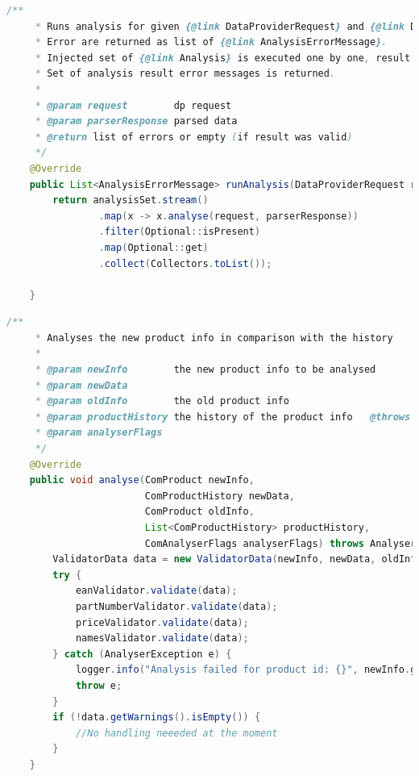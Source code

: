 \documentclass[thesis=B,czech]{FITthesis}[2012/06/26]
\begin{document}
\begin{lstlisting}[language=Java, caption={Upravená implementace hlavní metody ve třídě zajišťující spouštění validací analyzátoru}]
    /**
     * Runs analysis for given {@link DataProviderRequest} and {@link DPParserResponse}.
     * Error are returned as list of {@link AnalysisErrorMessage}.
     * Injected set of {@link Analysis} is executed one by one, result unwrapped and kept if present.
     * Set of analysis result error messages is returned.
     *
     * @param request        dp request
     * @param parserResponse parsed data
     * @return list of errors or empty (if result was valid)
     */
    @Override
    public List<AnalysisErrorMessage> runAnalysis(DataProviderRequest request, DPParserResponse parserResponse) {
        return analysisSet.stream()
                .map(x -> x.analyse(request, parserResponse))
                .filter(Optional::isPresent)
                .map(Optional::get)
                .collect(Collectors.toList());

    }
\end{lstlisting}
\par
\begin{lstlisting}[language=Java, caption={Původní implementace hlavní metody ve třídě zajišťující spouštění validací analyzátoru}]
    /**
     * Analyses the new product info in comparison with the history
     *
     * @param newInfo        the new product info to be analysed
     * @param newData
     * @param oldInfo        the old product info
     * @param productHistory the history of the product info   @throws AnalyserException when analysing fails, contains error type
     * @param analyserFlags
     */
    @Override
    public void analyse(ComProduct newInfo,
                        ComProductHistory newData,
                        ComProduct oldInfo,
                        List<ComProductHistory> productHistory,
                        ComAnalyserFlags analyserFlags) throws AnalyserException {
        ValidatorData data = new ValidatorData(newInfo, newData, oldInfo, productHistory, analyserFlags);
        try {
            eanValidator.validate(data);
            partNumberValidator.validate(data);
            priceValidator.validate(data);
            namesValidator.validate(data);
        } catch (AnalyserException e) {
            logger.info("Analysis failed for product id: {}", newInfo.getProductId(), e);
            throw e;
        }
        if (!data.getWarnings().isEmpty()) {
            //No handling neeeded at the moment
        }
    }
\end{lstlisting}
\end{document}
